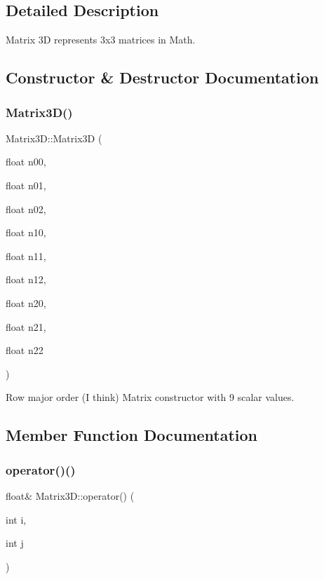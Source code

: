 \subsection{Detailed Description}
Matrix 3D represents 3x3 matrices in Math. 

\subsection{Constructor \& Destructor Documentation}
\mbox{\label{structMatrix3D_a2456e868e08fc543ac0933a7e1457856}} 
\subsubsection{\texorpdfstring{Matrix3\+D()}{Matrix3D()}}
{\footnotesize\ttfamily Matrix3\+D\+::\+Matrix3D (\begin{DoxyParamCaption}\item[{float}]{n00,  }\item[{float}]{n01,  }\item[{float}]{n02,  }\item[{float}]{n10,  }\item[{float}]{n11,  }\item[{float}]{n12,  }\item[{float}]{n20,  }\item[{float}]{n21,  }\item[{float}]{n22 }\end{DoxyParamCaption})\hspace{0.3cm}{\ttfamily [inline]}}

Row major order (I think) Matrix constructor with 9 scalar values. 

\subsection{Member Function Documentation}
\mbox{\label{structMatrix3D_ae44ce12f56a97fd58842e183d189227d}} 
\subsubsection{\texorpdfstring{operator()()}{operator()()}\hspace{0.1cm}{\footnotesize\ttfamily [1/2]}}
{\footnotesize\ttfamily float\& Matrix3\+D\+::operator() (\begin{DoxyParamCaption}\item[{int}]{i,  }\item[{int}]{j }\end{DoxyParamCaption})\hspace{0.3cm}{\ttfamily [inline]}}

